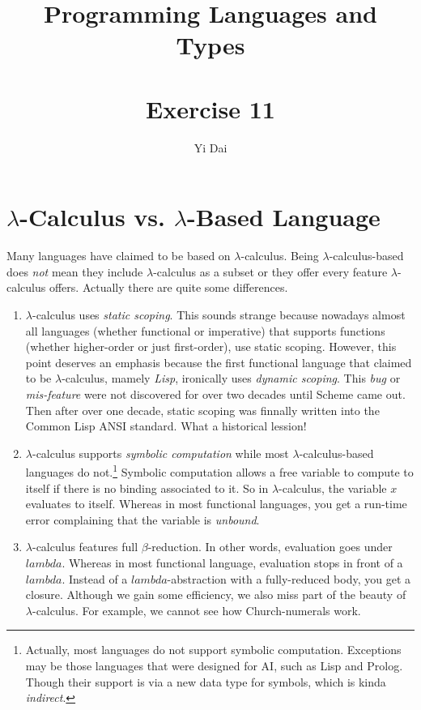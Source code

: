 \documentclass[a4paper,12pt]{article}
\title{
 Programming Languages and Types \\~\\
 \textbf{Exercise 11}
}
\author{
 Yi Dai
}
\begin{document}
\maketitle


\section{$\lambda$-Calculus vs. $\lambda$-Based Language}

Many languages have claimed to be based on $\lambda$-calculus.  Being $\lambda$-calculus-based does
\emph{not} mean they include $\lambda$-calculus as a subset or they offer every feature $\lambda$-calculus
offers.  Actually there are quite some differences.
\begin{enumerate}
 \item $\lambda$-calculus uses \emph{static scoping}.  This sounds strange because nowadays almost all
  languages (whether functional or imperative) that supports functions (whether higher-order or just
  first-order), use static scoping.  However, this point deserves an emphasis because the first functional
  language that claimed to be $\lambda$-calculus, mamely \emph{Lisp}, ironically uses \emph{dynamic scoping}.
  This \emph{bug} or \emph{mis-feature} were not discovered for over two decades until Scheme came out.
  Then after over one decade, static scoping was finnally written into the Common Lisp ANSI standard.  What
  a historical lession!
 \item $\lambda$-calculus supports \emph{symbolic computation} while most $\lambda$-calculus-based languages
  do not.\footnote{Actually, most languages do not support symbolic computation.  Exceptions may be those
  languages that were designed for AI, such as Lisp and Prolog.  Though their support is via a new data type
  for symbols, which is kinda \emph{indirect}.}  Symbolic computation allows a free variable to compute to
  itself if there is no binding associated to it.  So in $\lambda$-calculus, the variable $x$ evaluates to
  itself.  Whereas in most functional languages, you get a run-time error complaining that the variable is
  \emph{unbound}.
 \item $\lambda$-calculus features full $\beta$-reduction.  In other words, evaluation goes under $lambda$.
  Whereas in most functional language, evaluation stops in front of a $lambda$.  Instead of a
  $lambda$-abstraction with a fully-reduced body, you get a closure.  Although we gain some efficiency, we
  also miss part of the beauty of $\lambda$-calculus.  For example, we cannot see how Church-numerals work.
\end{enumerate}
\end{document}

